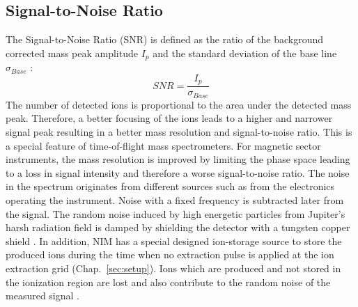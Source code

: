	\subsection{Signal-to-Noise Ratio }
	The Signal-to-Noise Ratio (SNR) is defined as the ratio of the background corrected mass peak amplitude $I_{p}$ and the standard deviation of the base line $\sigma_{Base}$ \cite{Agilent_TechNote_SNR,Master_Meyer}: %
	\begin{equation}
		SNR = \frac{I_{p}}{\sigma_{Base}}
		\label{eq:SNR}
	\end{equation}
	The number of detected ions is proportional to the area under the detected mass peak. Therefore, a better focusing of the ions leads to a higher and narrower signal peak resulting in a better mass resolution and signal-to-noise ratio. This is a special feature of time-of-flight mass spectrometers. For magnetic sector instruments, the mass resolution is improved by limiting the phase space leading to a loss in signal intensity and therefore a worse signal-to-noise ratio. The noise in the spectrum originates from different sources such as from the electronics operating the instrument. Noise with a fixed frequency is subtracted later from the signal. The random noise induced by high energetic particles from Jupiter's harsh radiation field is damped by shielding the detector with a tungsten copper shield \cite{Foehn2021}. In addition, NIM has a special designed ion-storage source to store the produced ions during the time when no extraction pulse is applied at the ion extraction grid (Chap.~\ref{sec:setup}). Ions which are produced and not stored in the ionization region are lost and also contribute to the random noise of the measured signal \cite{Diss_Abplanalp}. 


